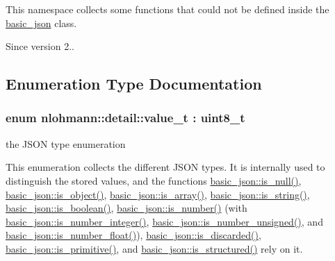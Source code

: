 This namespace collects some functions that could not be defined inside the \hyperlink{classnlohmann_1_1basic__json}{basic\+\_\+json} class.

\begin{DoxySince}{Since}
version 2.. 
\end{DoxySince}


\subsection{Enumeration Type Documentation}
\subsubsection[{\texorpdfstring{value\+\_\+t}{value_t}}]{\setlength{\rightskip}{0pt plus 5cm}enum {\bf nlohmann\+::detail\+::value\+\_\+t} \+: uint8\+\_\+t\hspace{0.3cm}{\ttfamily [strong]}}\hypertarget{namespacenlohmann_1_1detail_a90aa5ef615aa8305e9ea20d8a947980f}{}\label{namespacenlohmann_1_1detail_a90aa5ef615aa8305e9ea20d8a947980f}


the J\+S\+ON type enumeration 

This enumeration collects the different J\+S\+ON types. It is internally used to distinguish the stored values, and the functions \hyperlink{classnlohmann_1_1basic__json_a8faa039ca82427ed29c486ffd00600c3}{basic\+\_\+json\+::is\+\_\+null()}, \hyperlink{classnlohmann_1_1basic__json_af8f511af124e82e4579f444b4175787c}{basic\+\_\+json\+::is\+\_\+object()}, \hyperlink{classnlohmann_1_1basic__json_aef9ce5dd2381caee1f8ddcdb5bdd9c65}{basic\+\_\+json\+::is\+\_\+array()}, \hyperlink{classnlohmann_1_1basic__json_a69b596a4a6683b362095c9a139637396}{basic\+\_\+json\+::is\+\_\+string()}, \hyperlink{classnlohmann_1_1basic__json_a943e8cb182d0f2365c76d64b42eaa6fd}{basic\+\_\+json\+::is\+\_\+boolean()}, \hyperlink{classnlohmann_1_1basic__json_a2b9852390abb4b1ef5fac6984e2fc0f3}{basic\+\_\+json\+::is\+\_\+number()} (with \hyperlink{classnlohmann_1_1basic__json_abac8af76067f1e8fdca9052882c74428}{basic\+\_\+json\+::is\+\_\+number\+\_\+integer()}, \hyperlink{classnlohmann_1_1basic__json_abc7378cba0613a78b9aad1c8e7044bb0}{basic\+\_\+json\+::is\+\_\+number\+\_\+unsigned()}, and \hyperlink{classnlohmann_1_1basic__json_a33b4bf898b857c962e798fc7f6e86e70}{basic\+\_\+json\+::is\+\_\+number\+\_\+float()}), \hyperlink{classnlohmann_1_1basic__json_aabe623bc8304c2ba92d96d91f390fab4}{basic\+\_\+json\+::is\+\_\+discarded()}, \hyperlink{classnlohmann_1_1basic__json_a6362b88718eb5c6d4fed6a61eed44b95}{basic\+\_\+json\+::is\+\_\+primitive()}, and \hyperlink{classnlohmann_1_1basic__json_a9f68a0af820c3ced7f9d17851ce4c22d}{basic\+\_\+json\+::is\+\_\+structured()} rely on it.

